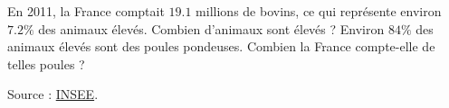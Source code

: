 
\begin{exercice}\label{exoPremiere-0004}

En 2011, la France comptait \( 19.1\) millions de bovins, ce qui représente environ \( 7.2\%\) des animaux élevés. Combien d'animaux sont élevés ? Environ \( 84\%\) des animaux élevés sont des poules pondeuses. Combien la France compte-elle de telles poules ?

Source : \href{http://www.insee.fr/fr/themes/tableau.asp?reg_id=0&ref_id=NATTEF10115}{INSEE}.

\end{exercice}
